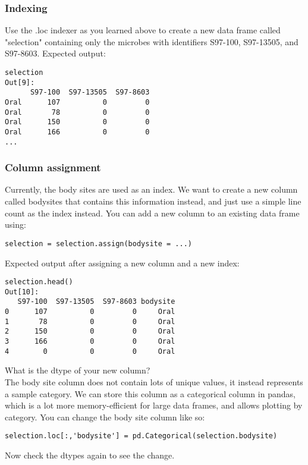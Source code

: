 \documentclass[12pt]{article}
\begin{document}
\subsubsection{Indexing}
Use the .loc indexer as you learned above to create a new data frame called "selection" containing only the microbes with identifiers S97-100, S97-13505, and S97-8603.
Expected output:
\begin{verbatim}
selection
Out[9]: 
      S97-100  S97-13505  S97-8603
Oral      107          0         0
Oral       78          0         0
Oral      150          0         0
Oral      166          0         0
...

\end{verbatim}
\subsubsection{Column assignment}
Currently, the body sites are used as an index. We want to create a new column called bodysites that contains this information instead, and just use a simple line count as the index instead. You can add a new column to an existing data frame using:
\begin{verbatim}
selection = selection.assign(bodysite = ...)

\end{verbatim}
Expected output after assigning a new column and a new index:
\begin{verbatim}
selection.head()
Out[10]: 
   S97-100  S97-13505  S97-8603 bodysite
0      107          0         0     Oral
1       78          0         0     Oral
2      150          0         0     Oral
3      166          0         0     Oral
4        0          0         0     Oral

\end{verbatim}
What is the dtype of your new column?\\

The body site column does not contain lots of unique values, it instead represents a sample category. We can store this column as a categorical column in pandas, which is a lot more memory-efficient for large data frames, and allows plotting by category.
You can change the body site column like so:
\begin{verbatim}
selection.loc[:,'bodysite'] = pd.Categorical(selection.bodysite)
\end{verbatim}
Now check the dtypes again to see the change.
\end{document}

